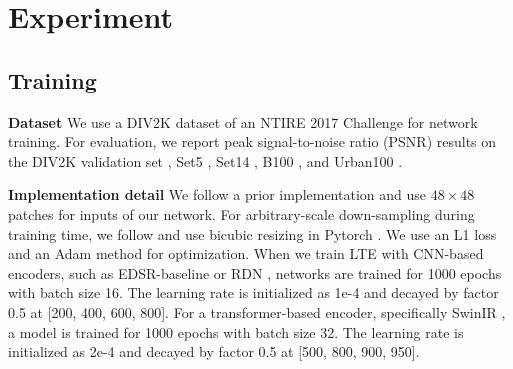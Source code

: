 \documentclass[10pt,twocolumn,letterpaper]{article}
\begin{document}
\section{Experiment}

\subsection{Training}
\textbf{Dataset} We use a DIV2K dataset \cite{8014884} of an NTIRE 2017 Challenge \cite{8014883} for network training. For evaluation, we report peak signal-to-noise ratio (PSNR) results on the DIV2K validation set \cite{8014884}, Set5 \cite{bevilacqua2012low}, Set14 \cite{zeyde2010single}, B100 \cite{martin2001database}, and Urban100 \cite{7299156}.

\textbf{Implementation detail} We follow a prior implementation \cite{Lim_2017_CVPR_Workshops} and use $48\times48$ patches for inputs of our network. For arbitrary-scale down-sampling during training time, we follow \cite{chen2021learning} and use bicubic resizing in Pytorch \cite{paszke2019pytorch}. We use an L1 loss \cite{Lim_2017_CVPR_Workshops} and an Adam \cite{DBLP:journals/corr/KingmaB14} method for optimization. When we train LTE with CNN-based encoders, such as EDSR-baseline \cite{Lim_2017_CVPR_Workshops} or RDN \cite{zhang2018residual}, networks are trained for 1000 epochs with batch size 16. The learning rate is initialized as 1e-4 and decayed by factor 0.5 at [200, 400, 600, 800]. For a transformer-based encoder, specifically SwinIR \cite{liang2021swinir}, a model is trained for 1000 epochs with batch size 32. The learning rate is initialized as 2e-4 and decayed by factor 0.5 at [500, 800, 900, 950].
\end{document}
